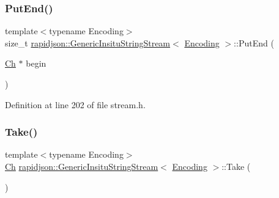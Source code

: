 \subsubsection{\texorpdfstring{PutEnd()}{PutEnd()}}
{\footnotesize\ttfamily template$<$typename Encoding$>$ \\
size\+\_\+t \mbox{\hyperlink{structrapidjson_1_1_generic_insitu_string_stream}{rapidjson\+::\+Generic\+Insitu\+String\+Stream}}$<$ \mbox{\hyperlink{classrapidjson_1_1_encoding}{Encoding}} $>$\+::Put\+End (\begin{DoxyParamCaption}\item[{\mbox{\hyperlink{structrapidjson_1_1_generic_insitu_string_stream_a3a7ed47ee193d1e5f850aa841b743631}{Ch}} $\ast$}]{begin }\end{DoxyParamCaption})}



Definition at line 202 of file stream.\+h.


\begin{DoxyCode}{0}

\end{DoxyCode}
\mbox{\label{structrapidjson_1_1_generic_insitu_string_stream_a99d4a96da7d602895136c90fed68695f}} 
\subsubsection{\texorpdfstring{Take()}{Take()}}
{\footnotesize\ttfamily template$<$typename Encoding$>$ \\
\mbox{\hyperlink{structrapidjson_1_1_generic_insitu_string_stream_a3a7ed47ee193d1e5f850aa841b743631}{Ch}} \mbox{\hyperlink{structrapidjson_1_1_generic_insitu_string_stream}{rapidjson\+::\+Generic\+Insitu\+String\+Stream}}$<$ \mbox{\hyperlink{classrapidjson_1_1_encoding}{Encoding}} $>$\+::Take (\begin{DoxyParamCaption}{ }\end{DoxyParamCaption})}



